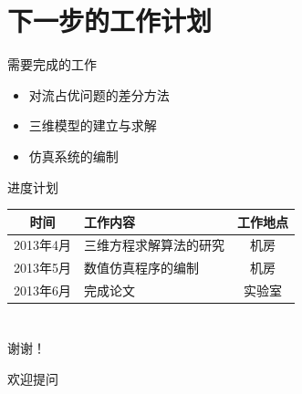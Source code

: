 \documentclass[xcolor=dvipsnames]{beamer}
\begin{document}
\section{下一步的工作计划}
	\begin{frame}{需要完成的工作}
	\begin{itemize}\setlength{\itemsep}{0em}
	\fangsong
	\item 对流占优问题的差分方法
	\item 三维模型的建立与求解
	\item 仿真系统的编制
	\end{itemize}\par
	\end{frame}
	\begin{frame}{进度计划}
	\kaishu
\begin{tabularx}{10cm}{cXc}
\toprule
时间 & \centering 工作内容 & 工作地点 \\
\midrule
2013年4月					& 三维方程求解算法的研究				&	机房			  \\
2013年5月					& 数值仿真程序的编制				&	机房			  \\
2013年6月					& 完成论文						&   实验室		  \\
\bottomrule
\end{tabularx}
	\end{frame}
	\section*{}
	\begin{frame}
	\begin{center}
	\Large
	谢谢！\par
	欢迎提问
	\end{center}
	\end{frame}
\end{document}
